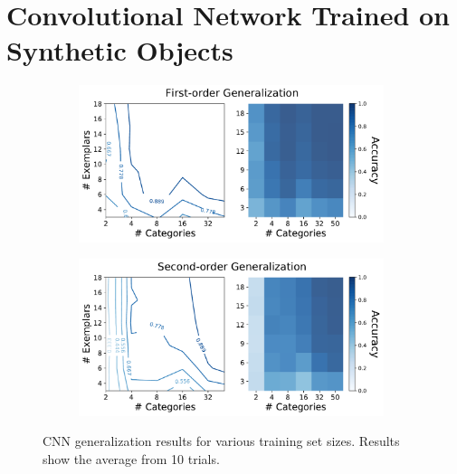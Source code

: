 \section{Convolutional Network Trained on Synthetic Objects}
\label{sec:simple_cnn}

\begin{figure}[t]
    \begin{center}
        \begin{subfigure}[b]{0.48\textwidth}
            \begin{center}
                \includegraphics[width=0.98\textwidth]
                {figures/cnn_o1_acc.pdf}
            \end{center}
        \end{subfigure}
        \begin{subfigure}[b]{0.48\textwidth}
            \begin{center}
                \includegraphics[width=0.98\textwidth]
                {figures/cnn_o2_acc.pdf}
            \end{center}
        \end{subfigure}
    \end{center}
    \caption{CNN generalization results for various training set sizes. Results
    show the average from 10 trials.}
    \label{fig:cnn_gen_results}
\end{figure}

